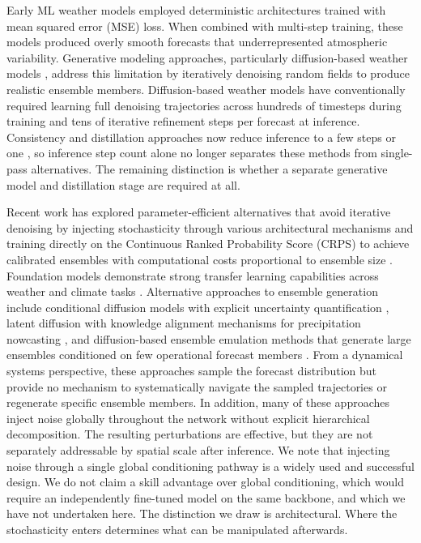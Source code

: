 \documentclass{agujournal2019}
\begin{document}
Early ML weather models employed deterministic architectures trained with mean squared error (MSE) loss. When combined with multi-step training, these models produced overly smooth forecasts that underrepresented atmospheric variability. Generative modeling approaches, particularly diffusion-based weather models \cite{sohl-dickstein2015deep, ho2020denoising, song2021scorebased, price2025gencast}, address this limitation by iteratively denoising random fields to produce realistic ensemble members. Diffusion-based weather models \cite{price2025gencast} have conventionally required learning full denoising trajectories across hundreds of timesteps during training and tens of iterative refinement steps per forecast at inference. Consistency and distillation approaches now reduce inference to a few steps or one \cite{stock2025swift}, so inference step count alone no longer separates these methods from single-pass alternatives. The remaining distinction is whether a separate generative model and distillation stage are required at all.

Recent work has explored parameter-efficient alternatives that avoid iterative denoising by injecting stochasticity through various architectural mechanisms and training directly on the Continuous Ranked Probability Score (CRPS) to achieve calibrated ensembles with computational costs proportional to ensemble size \cite{lang2024aifs, alet2024fgn, bonev2025fourcastnet3, fuxi_ens, kochkov2024neuralgcm}. Foundation models demonstrate strong transfer learning capabilities across weather and climate tasks \cite{nguyen2023climax, bodnar2025aurora, allen2025aardvark}. Alternative approaches to ensemble generation include conditional diffusion models with explicit uncertainty quantification \cite{shi2025codicast}, latent diffusion with knowledge alignment mechanisms for precipitation nowcasting \cite{gao2023prediff}, and diffusion-based ensemble emulation methods that generate large ensembles conditioned on few operational forecast members \cite{price2024seeds}. From a dynamical systems perspective, these approaches sample the forecast distribution but provide no mechanism to systematically navigate the sampled trajectories or regenerate specific ensemble members. In addition, many of these approaches inject noise globally throughout the network without explicit hierarchical decomposition. The resulting perturbations are effective, but they are not separately addressable by spatial scale after inference. We note that injecting noise through a single global conditioning pathway is a widely used and successful design. We do not claim a skill advantage over global conditioning, which would require an independently fine-tuned model on the same backbone, and which we have not undertaken here. The distinction we draw is architectural. Where the stochasticity enters determines what can be manipulated afterwards.
\end{document}
